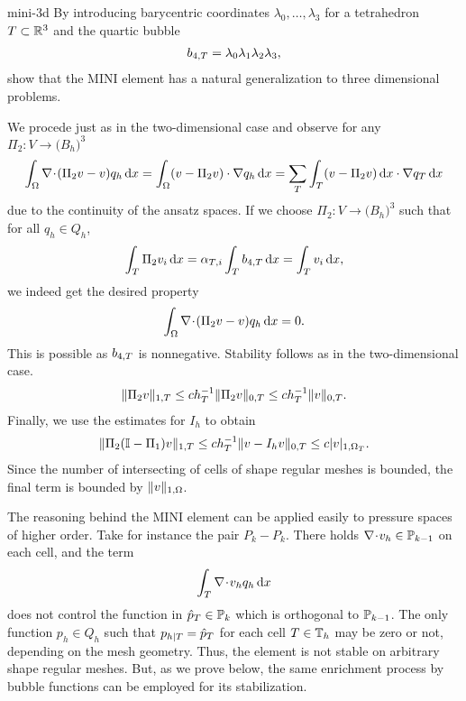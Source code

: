 \begin{Problem}{mini-3d}
  By introducing barycentric coordinates $\lambda_0,\dots,\lambda_3$
  for a tetrahedron $\cell\subset\R^3$ and the quartic bubble
  \begin{gather}
    b_{4,\cell} = \lambda_0\lambda_1\lambda_2\lambda_3,
  \end{gather}
  show that the MINI element has a natural generalization to three
  dimensional problems.
\begin{solution}
  We procede just as in the two-dimensional case and observe for any
  $\Pi_2: V \to \bigl(B_h\bigr)^3$
  \begin{align*}
    \int_\domain \div(\Pi_2 v-v) q_h \dx
    = \int_\domain (v-\Pi_2v)\cdot\nabla q_h\dx = \sum_\cell\int_\cell (v-\Pi_2v)\dx\cdot\nabla q_\cell\dx
  \end{align*}
  due to the continuity of the ansatz spaces.
  If we choose $\Pi_2: V \to \bigl(B_h\bigr)^3$ such that for all $q_h\in Q_h$,
  \begin{align*}
   \int_\cell \Pi_2 v_i \dx
    = \alpha_{\cell,i} \int_\cell b_{4,\cell}\dx
    = \int_\cell v_i\dx,
  \end{align*}
  we indeed get the desired property
  \begin{align*}
    \int_\domain \div(\Pi_2 v-v) q_h \dx = 0.
  \end{align*}
  This is possible as $b_{4,\cell}$ is nonnegative. Stability follows as in the two-dimensional case.
  \begin{gather*}
    \norm{\Pi_2 v}_{1,\cell}
    \le c h_\cell^{-1} \norm{\Pi_2 v}_{0,\cell}
    \le c h_\cell^{-1} \norm{v}_{0,\cell}.
  \end{gather*}
  Finally, we use the estimates for $I_h$ to obtain
  \begin{gather*}
    \norm{\Pi_2 (\identity-\Pi_1) v}_{1,\cell}
    \le c h_\cell^{-1} \norm{v-I_h v}_{0,\cell}
    \le c \snorm{v}_{1,\domain_\cell}.
  \end{gather*}
  Since the number of intersecting of cells of shape regular meshes is
  bounded, the final term is bounded by $\norm v_{1,\domain}$.
\end{solution}

\end{Problem}

\begin{intro}
  The reasoning behind the MINI element can be applied easily to
  pressure spaces of higher order. Take for instance the pair
  $P_k-P_k$. There holds $\div v_h \in \P_{k-1}$ on each cell,
  and the term
  \begin{gather*}
    \int_\cell \div v_h q_h\dx
  \end{gather*}
  does not control the function in $\hat p_\cell \in \P_k$ which is
  orthogonal to $\P_{k-1}$. The only function $p_h\in Q_h$ such that
  $p_{h|\cell} = \hat p_\cell$ for each cell $\cell\in\mesh_h$ may be
  zero or not, depending on the mesh geometry. Thus, the element is
  not stable on arbitrary shape regular meshes. But, as we prove
  below, the same enrichment process by bubble functions can be
  employed for its stabilization.
\end{intro}

